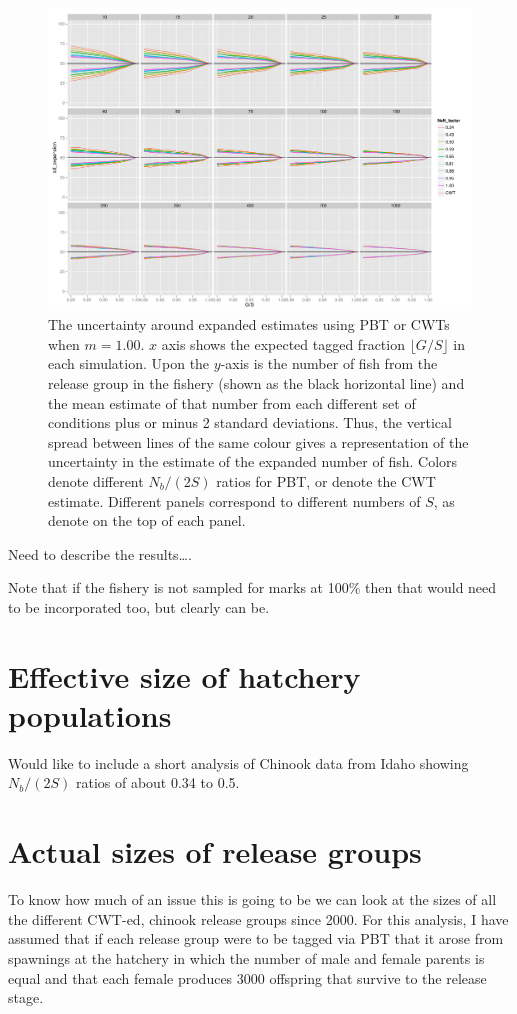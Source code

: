 \documentclass[11pt]{article}
\begin{document}
\begin{figure}
\includegraphics[width = .93\textwidth]{./images/sd_line_horns_m_1.pdf}
\caption{The uncertainty around expanded estimates using PBT or CWTs when $m = 1.00$.  $x$ axis shows the
expected tagged fraction $\lfloor G/S \rfloor$ in each simulation. Upon the $y$-axis is the number of fish from the
release group in the fishery (shown as the black horizontal line) and the mean estimate of that number from each different set of 
conditions plus or minus 2 standard deviations.  Thus, the vertical spread between lines of the same colour gives a representation
of the uncertainty in the estimate of the expanded number of fish. Colors denote different $N_b/(2S)$ ratios for PBT, or denote
the CWT estimate.  Different
panels correspond to different numbers of $S$, as denote on the top of each panel.
\label{fig:all_sds}}
\end{figure}


Need to describe the results\ldots.

Note that if the fishery is not sampled for marks at 100\% then that would need to be incorporated too, but clearly can be.


\section{Effective size of hatchery populations}

Would like to include a short analysis of Chinook data from Idaho showing $N_b/(2S)$ ratios of about 0.34 to 0.5.

\section{Actual sizes of release groups}
To know how much of an issue this is going to be we can look at the sizes of all the different
CWT-ed, chinook release groups since 2000.  For this analysis, I have assumed that if each release group
were to be tagged via PBT that it arose from spawnings at the hatchery in which the number of male
and female parents is equal and that each female produces 3000 offspring that survive to the release stage.
\end{document}
